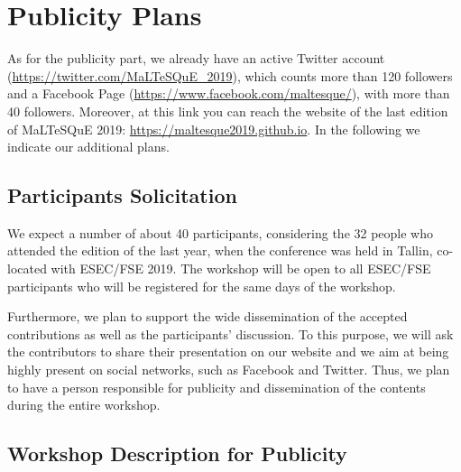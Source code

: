 
\section{Publicity Plans}

As for the publicity part, we already have an active Twitter account (\url{https://twitter.com/MaLTeSQuE_2019}), which counts more than 120 followers and a Facebook Page (\url{https://www.facebook.com/maltesque/}), with more than 40 followers.
Moreover, at this link you can reach the website of the last edition of MaLTeSQuE 2019: \url{https://maltesque2019.github.io}.
In the following we indicate our additional plans.

\subsection{Participants Solicitation}

We expect a number of about 40 participants, considering the 32 people who attended the edition of the last year, when the conference was held in Tallin, co-located with ESEC/FSE 2019.
The workshop will be open to all ESEC/FSE participants who will be registered for the same days of the workshop.

Furthermore, we plan to support the wide dissemination of the accepted contributions as well as the participants' discussion.
To this purpose, we will ask the contributors to share their presentation on our website and we aim at being highly present on social networks, such as Facebook and Twitter.
Thus, we plan to have a person responsible for publicity and dissemination of the contents during the entire workshop.

\subsection{Workshop Description for Publicity}

